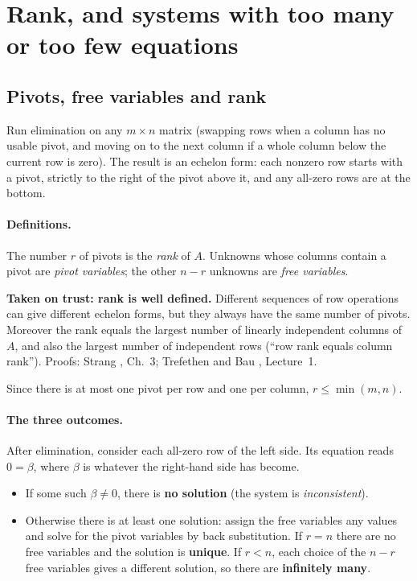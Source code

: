 \section{Rank, and systems with too many or too few equations}\label{sec:linear-algebra-rank}

\subsection{Pivots, free variables and rank}

Run elimination on any $m\times n$ matrix (swapping rows when a column has no usable pivot, and moving on to the next column if a whole column below the current row is zero). The result is an echelon form: each nonzero row starts with a pivot, strictly to the right of the pivot above it, and any all-zero rows are at the bottom.

\paragraph{Definitions.} The number $r$ of pivots is the \emph{rank} of $A$. Unknowns whose columns contain a pivot are \emph{pivot variables}; the other $n-r$ unknowns are \emph{free variables}.

\begin{beyond}
\textbf{Taken on trust: rank is well defined.} Different sequences of row operations can give different echelon forms, but they always have the same number of pivots. Moreover the rank equals the largest number of linearly independent columns of $A$, and also the largest number of independent rows (``row rank equals column rank''). Proofs: Strang \cite{strang}, Ch.~3; Trefethen and Bau \cite{trefethen}, Lecture~1.
\end{beyond}

Since there is at most one pivot per row and one per column, $r\le\min(m,n)$.

\paragraph{The three outcomes.} After elimination, consider each all-zero row of the left side. Its equation reads $0=\beta$, where $\beta$ is whatever the right-hand side has become.
\begin{itemize}
\item If some such $\beta\neq0$, there is \textbf{no solution} (the system is \emph{inconsistent}).
\item Otherwise there is at least one solution: assign the free variables any values and solve for the pivot variables by back substitution. If $r=n$ there are no free variables and the solution is \textbf{unique}. If $r<n$, each choice of the $n-r$ free variables gives a different solution, so there are \textbf{infinitely many}.
\end{itemize}

